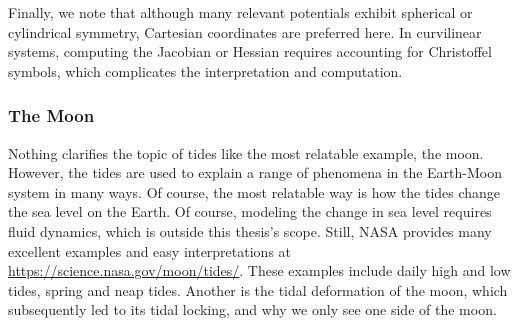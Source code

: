         Finally, we note that although many relevant potentials exhibit spherical or cylindrical symmetry, Cartesian coordinates are preferred here. In curvilinear systems, computing the Jacobian or Hessian requires accounting for Christoffel symbols, which complicates the interpretation and computation.


        
        \subsubsection*{The Moon}


            Nothing clarifies the topic of tides like the most relatable example, the moon. However, the tides are used to explain a range of phenomena in the Earth-Moon system in many ways. Of course, the most relatable way is how the tides change the sea level on the Earth. Of course, modeling the change in sea level requires fluid dynamics, which is outside this thesis's scope. Still, NASA provides many excellent examples and easy interpretations at \href{https://science.nasa.gov/moon/tides/}{https://science.nasa.gov/moon/tides/}. These examples include daily high and low tides, spring and neap tides. Another is the tidal deformation of the moon, which subsequently led to its tidal locking, and why we only see one side of the moon.

